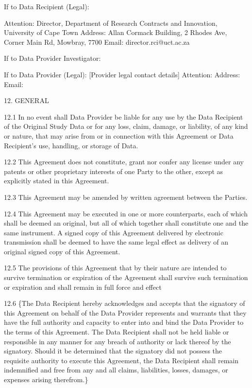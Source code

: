 \documentclass[12pt,letterpaper]{article}
\newcommand{\added}[1]{\textcolor{addcolor}{#1}}
\begin{document}
If to Data Recipient (Legal):

Attention: Director, Department of Research Contracts and Innovation, University of Cape Town Address: Allan Cormack Building, 2 Rhodes Ave, Corner Main Rd, Mowbray, 7700 Email: director.rci@uct.ac.za 

If to Data Provider Investigator:

If to Data Provider (Legal): [Provider legal contact details] Attention: Address: Email:

12.	GENERAL

12.1	In no event shall Data Provider be liable for any use by the Data Recipient of the Original Study Data or for any loss, claim, damage, or liability, of any kind or nature, that may arise from or in connection with this Agreement or Data Recipient’s use, handling, or storage of Data. 

12.2	This Agreement does not constitute, grant nor confer any license under any patents or other proprietary interests of one Party to the other, except as explicitly stated in this Agreement.

12.3	This Agreement may be amended by written agreement between the Parties.

12.4	This Agreement may be executed in one or more counterparts, each of which shall be deemed an original, but all of which together shall constitute one and the same instrument. A signed copy of this Agreement delivered by electronic transmission shall be deemed to have the same legal effect as delivery of an original signed copy of this Agreement.

12.5 	The provisions of this Agreement that by their nature are intended to survive termination or expiration of the Agreement shall survive such termination or expiration and shall remain in full force and effect

12.6	\added\{The Data Recipient hereby acknowledges and accepts that the signatory of this Agreement on behalf of the Data Provider represents and warrants that they have the full authority and capacity to enter into and bind the Data Provider to the terms of this Agreement. The Data Recipient shall not be held liable or responsible in any manner for any breach of authority or lack thereof by the signatory. Should it be determined that the signatory did not possess the requisite authority to execute this Agreement, the Data Recipient shall remain indemnified and free from any and all claims, liabilities, losses, damages, or expenses arising therefrom.\}
\end{document}
